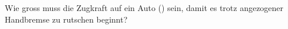 Wie gross muss die Zugkraft auf ein Auto (\mAuO) sein, damit es trotz angezogener Handbremse zu rutschen beginnt?
